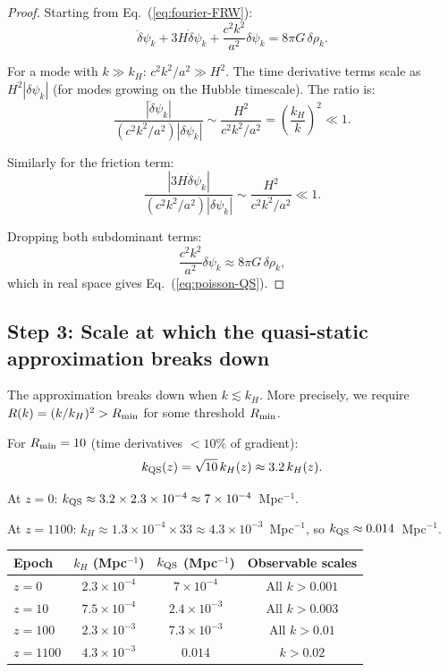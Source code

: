 \documentclass[11pt]{article}
\newcommand{\ee}[1]{\times 10^{#1}}
\newcommand{\dpsi}{\delta\psi}
\begin{document}
\begin{proof}
Starting from Eq.~(\ref{eq:fourier-FRW}):
\begin{equation}
\ddot\dpsi_k + 3H\dot\dpsi_k + \frac{c^2 k^2}{a^2}\dpsi_k = 8\pi G\,\delta\rho_k.
\end{equation}

For a mode with $k \gg k_H$: $c^2k^2/a^2 \gg H^2$. The time derivative
terms scale as $H^2|\dpsi_k|$ (for modes growing on the Hubble timescale).
The ratio is:
\begin{equation}
\frac{|\ddot\dpsi_k|}{(c^2k^2/a^2)|\dpsi_k|}
\sim \frac{H^2}{c^2k^2/a^2}
= \left(\frac{k_H}{k}\right)^2 \ll 1.
\end{equation}

Similarly for the friction term:
\begin{equation}
\frac{|3H\dot\dpsi_k|}{(c^2k^2/a^2)|\dpsi_k|}
\sim \frac{H^2}{c^2k^2/a^2} \ll 1.
\end{equation}

Dropping both subdominant terms:
\begin{equation}
\frac{c^2k^2}{a^2}\dpsi_k \approx 8\pi G\,\delta\rho_k,
\end{equation}
which in real space gives Eq.~(\ref{eq:poisson-QS}).
\end{proof}

\subsection{Step 3: Scale at which the quasi-static approximation breaks down}

The approximation breaks down when $k \lesssim k_H$. More precisely,
we require $R(k) = (k/k_H)^2 > R_{\rm min}$ for some threshold
$R_{\rm min}$.

For $R_{\rm min} = 10$ (time derivatives $<10\%$ of gradient):
\begin{equation}
k_{\rm QS}(z) = \sqrt{10}\,k_H(z) \approx 3.2\,k_H(z).
\end{equation}

At $z = 0$: $k_{\rm QS} \approx 3.2 \times 2.3\ee{-4} \approx 7\ee{-4}$~Mpc$^{-1}$.

At $z = 1100$: $k_H \approx 1.3\ee{-4}\times 33 \approx 4.3\ee{-3}$~Mpc$^{-1}$,
so $k_{\rm QS} \approx 0.014$~Mpc$^{-1}$.

\begin{center}
\begin{tabular}{lccc}
\toprule
Epoch & $k_H$ (Mpc$^{-1}$) & $k_{\rm QS}$ (Mpc$^{-1}$) & Observable scales \\
\midrule
$z = 0$ & $2.3\ee{-4}$ & $7\ee{-4}$ & All $k > 0.001$ \\
$z = 10$ & $7.5\ee{-4}$ & $2.4\ee{-3}$ & All $k > 0.003$ \\
$z = 100$ & $2.3\ee{-3}$ & $7.3\ee{-3}$ & All $k > 0.01$ \\
$z = 1100$ & $4.3\ee{-3}$ & $0.014$ & $k > 0.02$ \\
\bottomrule
\end{tabular}
\end{center}
\end{document}
